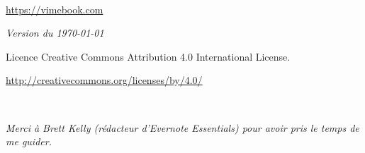 
\setcounter{tocdepth}{1}



\frontmatter

\maketitle

\newpage
\begin{fullwidth}
~\vfill
\thispagestyle{empty}
\setlength{\parindent}{0pt}
\setlength{\parskip}{\baselineskip}

\par{}

\par \url{https://vimebook.com}
\par\textit{Version du  \today}
\par{Licence  Creative Commons Attribution 4.0 International License.}
\par{\url{http://creativecommons.org/licenses/by/4.0/}}

\end{fullwidth}

\tableofcontents


\cleardoublepage
~\vfill
\begin{doublespace}
\noindent\fontsize{18}{22}\selectfont\itshape
\nohyphenation
Merci à Brett Kelly (rédacteur d'Evernote Essentials) pour avoir pris le temps de me guider.
\end{doublespace}
\vfill
\vfill

\cleardoublepage





\mainmatter









\listoffigures

\printindex



